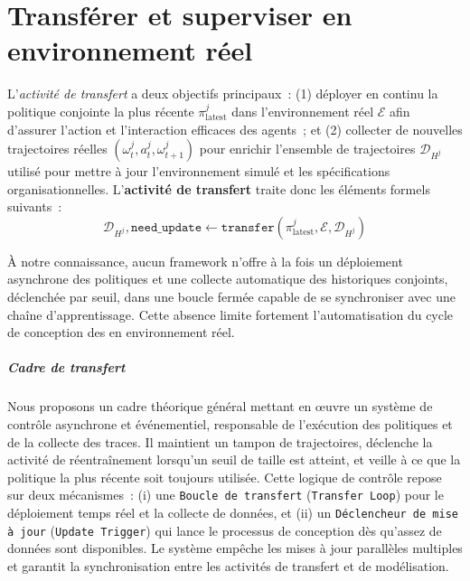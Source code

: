 \clearpage
\thispagestyle{empty}
\null
\newpage

\chapter{Transférer et superviser en environnement réel}
\label{chap:transferring}

L'\textit{activité de transfert} a deux objectifs principaux~: (1) déployer en continu la politique conjointe la plus récente $\pi^j_{\text{latest}}$ dans l'environnement réel $\mathcal{E}$ afin d'assurer l'action et l'interaction efficaces des agents~; et (2) collecter de nouvelles trajectoires réelles $(\omega^j_t, a^j_t, \omega^j_{t+1})$ pour enrichir l'ensemble de trajectoires $\mathcal{D}_{H^j}$ utilisé pour mettre à jour l'environnement simulé et les spécifications organisationnelles.
\noindent L'\textbf{activité de transfert} traite donc les éléments formels suivants~:
\[
  \mathcal{D}_{H^j}, \texttt{need\_update} \gets \texttt{transfer}(\pi^j_{\text{latest}}, \mathcal{E}, \mathcal{D}_{H^j})
\]

\noindent À notre connaissance, aucun framework n'offre à la fois un déploiement asynchrone des politiques et une collecte automatique des historiques conjoints, déclenchée par seuil, dans une boucle fermée capable de se synchroniser avec une chaîne d'apprentissage. Cette absence limite fortement l'automatisation du cycle de conception des  en environnement réel.

\paragraph{Cadre de transfert}

Nous proposons un cadre théorique général mettant en œuvre un système de contrôle asynchrone et événementiel, responsable de l'exécution des politiques et de la collecte des traces. Il maintient un tampon de trajectoires, déclenche la activité de réentraînement lorsqu'un seuil de taille est atteint, et veille à ce que la politique la plus récente soit toujours utilisée. Cette logique de contrôle repose sur deux mécanismes~:
(i) une \texttt{Boucle de transfert} (\texttt{Transfer Loop}) pour le déploiement temps réel et la collecte de données, et
(ii) un \texttt{Déclencheur de mise à jour} (\texttt{Update Trigger}) qui lance le processus de conception dès qu'assez de données sont disponibles. Le système empêche les mises à jour parallèles multiples et garantit la synchronisation entre les activités de transfert et de modélisation.

